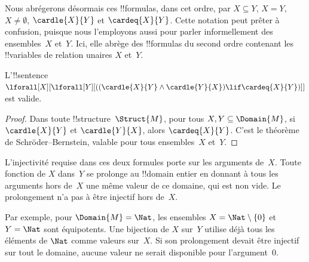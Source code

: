 \documentclass[../../../include/open-logic-section]{subfiles}
\begin{document}
Nous abrégerons désormais ces !!{formula}s,
dans cet ordre, par $X\subseteq Y$, $X=Y$,
$X\neq\emptyset$, $\cardle{X}{Y}$ et
$\cardeq{X}{Y}$. Cette notation peut prêter
à confusion, puisque nous l'employons aussi
pour parler informellement des ensembles~$X$
et~$Y$. Ici, elle abrège des !!{formula}s du
second ordre contenant les !!{variable}s de
relation unaires $X$ et~$Y$.

\begin{prop}
L'!!{sentence}
$\lforall[X][\lforall[Y][((\cardle{X}{Y}\land
\cardle{Y}{X})\lif\cardeq{X}{Y})]]$
est valide.
\end{prop}

\begin{proof}
Dans toute !!{structure}~$\Struct{M}$,
pour tous $X,Y\subseteq\Domain{M}$,
si $\cardle{X}{Y}$ et $\cardle{Y}{X}$,
alors $\cardeq{X}{Y}$. C'est le théorème
de Schröder--Bernstein, valable pour tous
ensembles~$X$ et~$Y$.
\end{proof}

L'injectivité requise dans ces deux formules porte sur les
arguments de~$X$. Toute fonction de $X$ dans~$Y$ se prolonge
au !!{domain} entier en donnant à tous les arguments hors
de~$X$ une même valeur de ce domaine, qui est non vide.
Le prolongement n'a pas à être injectif hors de~$X$.

Par exemple, pour $\Domain{M}=\Nat$, les ensembles
$X=\Nat\setminus\{0\}$ et $Y=\Nat$ sont équipotents.
Une bijection de $X$ sur~$Y$ utilise déjà tous les éléments de
$\Nat$ comme valeurs sur~$X$. Si son prolongement devait être
injectif sur tout le domaine, aucune valeur ne serait disponible
pour l'argument~$0$.
\end{document}
